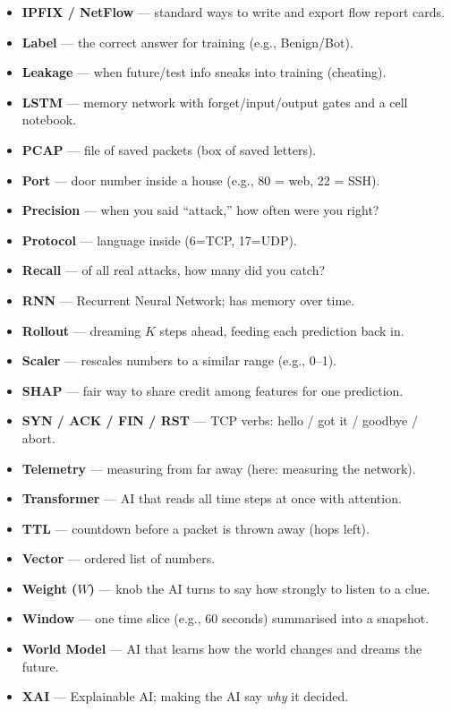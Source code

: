 \documentclass[11pt,a4paper]{article}
\begin{document}
\begin{itemize}[leftmargin=1.4em,itemsep=1pt]
  \item \textbf{IPFIX / NetFlow} --- standard ways to write and export flow report cards.
  \item \textbf{Label} --- the correct answer for training (e.g., Benign/Bot).
  \item \textbf{Leakage} --- when future/test info sneaks into training (cheating).
  \item \textbf{LSTM} --- memory network with forget/input/output gates and a cell notebook.
  \item \textbf{PCAP} --- file of saved packets (box of saved letters).
  \item \textbf{Port} --- door number inside a house (e.g., 80 = web, 22 = SSH).
  \item \textbf{Precision} --- when you said ``attack,'' how often were you right?
  \item \textbf{Protocol} --- language inside (6=TCP, 17=UDP).
  \item \textbf{Recall} --- of all real attacks, how many did you catch?
  \item \textbf{RNN} --- Recurrent Neural Network; has memory over time.
  \item \textbf{Rollout} --- dreaming $K$ steps ahead, feeding each prediction back in.
  \item \textbf{Scaler} --- rescales numbers to a similar range (e.g., 0--1).
  \item \textbf{SHAP} --- fair way to share credit among features for one prediction.
  \item \textbf{SYN / ACK / FIN / RST} --- TCP verbs: hello / got it / goodbye / abort.
  \item \textbf{Telemetry} --- measuring from far away (here: measuring the network).
  \item \textbf{Transformer} --- AI that reads all time steps at once with attention.
  \item \textbf{TTL} --- countdown before a packet is thrown away (hops left).
  \item \textbf{Vector} --- ordered list of numbers.
  \item \textbf{Weight ($W$)} --- knob the AI turns to say how strongly to listen to a clue.
  \item \textbf{Window} --- one time slice (e.g., 60 seconds) summarised into a snapshot.
  \item \textbf{World Model} --- AI that learns how the world changes and dreams the future.
  \item \textbf{XAI} --- Explainable AI; making the AI say \emph{why} it decided.
\end{itemize}
\end{document}
